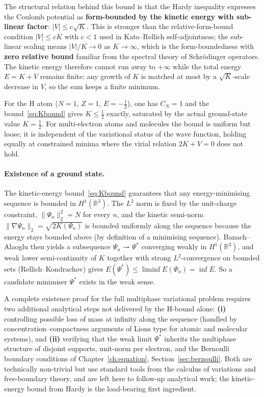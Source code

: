 The structural relation behind this bound is that the Hardy inequality expresses the Coulomb potential as \textbf{form-bounded by the kinetic energy with sub-linear factor}: $|V| \le c\sqrt{K}$. This is stronger than the relative-form-bound condition $|V| \le c K$ with $c < 1$ used in Kato--Rellich self-adjointness; the sub-linear scaling means $|V|/K \to 0$ as $K \to \infty$, which is the form-boundedness with \textbf{zero relative bound} familiar from the spectral theory of Schr\"odinger operators. The kinetic energy therefore cannot run away to $+\infty$ while the total energy $E = K + V$ remains finite: any growth of $K$ is matched at most by a $\sqrt{K}$-scale decrease in $V$, so the sum keeps a finite minimum.

For the H atom ($N = 1$, $Z = 1$, $E = -\tfrac{1}{2}$), one has $C_N = 1$ and the bound~\eqref{eq:Kbound} gives $K \le \tfrac{1}{2}$ exactly, saturated by the actual ground-state value $K = \tfrac{1}{2}$. For multi-electron atoms and molecules the bound is uniform but loose; it is independent of the variational status of the wave function, holding equally at constrained minima where the virial relation $2K + V = 0$ does not hold.

\paragraph{Existence of a ground state.}
The kinetic-energy bound~\eqref{eq:Kbound} guarantees that any energy-minimising sequence is bounded in $H^1(\mathbb{R}^3)$. The $L^2$ norm is fixed by the unit-charge constraint, $\|\Psi_n\|_2^2 = N$ for every $n$, and the kinetic semi-norm $\|\nabla \Psi_n\|_2 = \sqrt{2K(\Psi_n)}$ is bounded uniformly along the sequence because the energy stays bounded above (by definition of a minimising sequence). Banach--Alaoglu then yields a subsequence $\Psi_n \rightharpoonup \Psi^*$ converging weakly in $H^1(\mathbb{R}^3)$, and weak lower semi-continuity of $K$ together with strong $L^2$-convergence on bounded sets (Rellich--Kondrachov) gives $E(\Psi^*) \le \liminf E(\Psi_n) = \inf E$. So a candidate minimiser $\Psi^*$ exists in the weak sense.

A complete existence proof for the full multiphase variational problem requires two additional analytical steps not delivered by the H-bound alone: \textbf{(i)} controlling possible loss of mass at infinity along the sequence (handled by concentration--compactness arguments of Lions type for atomic and molecular systems), and \textbf{(ii)} verifying that the weak limit $\Psi^*$ inherits the multiphase structure of disjoint supports, unit-norm per electron, and the Bernoulli boundary conditions of Chapter~\ref{ch:equation}, Section~\ref{sec:bernoulli}. Both are technically non-trivial but use standard tools from the calculus of variations and free-boundary theory, and are left here to follow-up analytical work; the kinetic-energy bound from Hardy is the load-bearing first ingredient.

